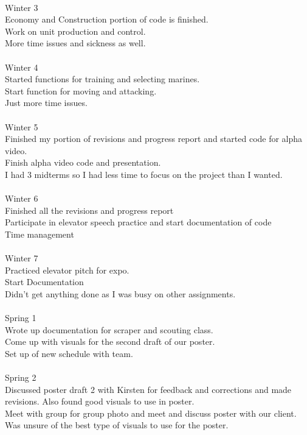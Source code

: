 \documentclass[10pt,letterpaper,onecolumn,draftclsnofoot]{IEEEtran}
\begin{document}
\\
Winter 3\\
Economy and Construction portion of code is finished.\\ Work on unit production and control.\\ More time issues and sickness as well.\\
\\
Winter 4\\
Started functions for training and selecting marines.\\ Start function for moving and attacking.\\ Just more time issues.\\
\\
Winter 5\\
Finished my portion of revisions and progress report and started code for alpha video.\\ Finish alpha video code and presentation.\\ I had 3 midterms so I had less time to focus on the project than I wanted.\\
\\
Winter 6\\
Finished all the revisions and progress report\\ Participate in elevator speech practice and start documentation of code\\ Time management\\
\\
Winter 7\\
Practiced elevator pitch for expo.\\ Start Documentation\\ Didn't get anything done as I was busy on other assignments.\\
\\
Spring 1\\
Wrote up documentation for scraper and scouting class.\\ Come up with visuals for the second draft of our poster.\\ Set up of new schedule with team.\\
\\
Spring 2\\
Discussed poster draft 2 with Kirsten for feedback and corrections and made revisions. Also found good visuals to use in poster.\\ Meet with group for group photo and meet and discuss poster with our client.\\ Was unsure of the best type of visuals to use for the poster.\\
\end{document}
